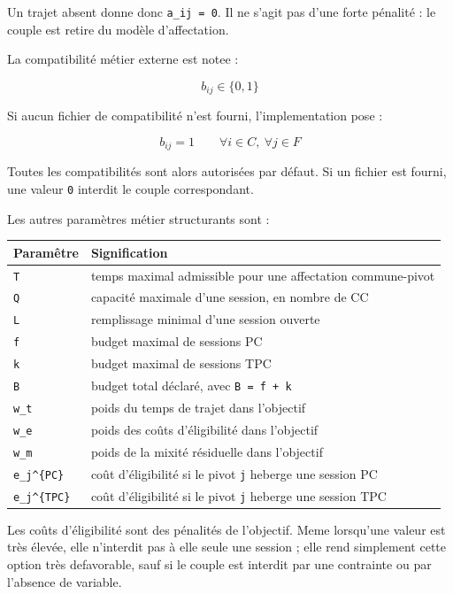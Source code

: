 \documentclass[11pt,a4paper]{article}
\begin{document}
Un trajet absent donne donc \texttt{a\_ij = 0}. Il ne s'agit pas d'une forte pénalité : le couple est retire du modèle d'affectation.

La compatibilité métier externe est notee :

\[
b_{ij} \in \{0,1\}
\]

Si aucun fichier de compatibilité n'est fourni, l'implementation pose :

\[
b_{ij}=1
\qquad
\forall i \in C,\ \forall j \in F
\]

Toutes les compatibilités sont alors autorisées par défaut. Si un fichier est fourni, une valeur \texttt{0} interdit le couple correspondant.

Les autres paramètres métier structurants sont :

\begin{longtable}{|L{0.28\textwidth}|L{0.62\textwidth}|}
\hline
Paramêtre & Signification \\
\hline
\endhead
\texttt{T} & temps maximal admissible pour une affectation commune-pivot \\
\hline
\texttt{Q} & capacité maximale d'une session, en nombre de CC \\
\hline
\texttt{L} & remplissage minimal d'une session ouverte \\
\hline
\texttt{f} & budget maximal de sessions PC \\
\hline
\texttt{k} & budget maximal de sessions TPC \\
\hline
\texttt{B} & budget total déclaré, avec \texttt{B = f + k} \\
\hline
\texttt{w\_t} & poids du temps de trajet dans l'objectif \\
\hline
\texttt{w\_e} & poids des coûts d'éligibilité dans l'objectif \\
\hline
\texttt{w\_m} & poids de la mixité résiduelle dans l'objectif \\
\hline
\texttt{e\_j\textasciicircum{}\{PC\}} & coût d'éligibilité si le pivot \texttt{j} heberge une session PC \\
\hline
\texttt{e\_j\textasciicircum{}\{TPC\}} & coût d'éligibilité si le pivot \texttt{j} heberge une session TPC \\
\hline
\end{longtable}

Les coûts d'éligibilité sont des pénalités de l'objectif. Meme lorsqu'une valeur est très élevée, elle n'interdit pas à elle seule une session ; elle rend simplement cette option très defavorable, sauf si le couple est interdit par une contrainte ou par l'absence de variable.
\end{document}
